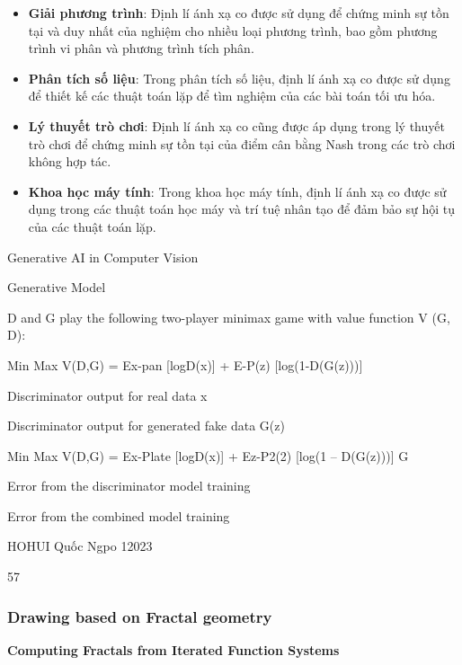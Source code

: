 \begin{itemize}
    \item \textbf{Giải phương trình}: Định lí ánh xạ co được sử dụng để chứng minh sự tồn tại và duy nhất của nghiệm cho nhiều loại phương trình, bao gồm phương trình vi phân và phương trình tích phân.
    \item \textbf{Phân tích số liệu}: Trong phân tích số liệu, định lí ánh xạ co được sử dụng để thiết kế các thuật toán lặp để tìm nghiệm của các bài toán tối ưu hóa.
    \item \textbf{Lý thuyết trò chơi}: Định lí ánh xạ co cũng được áp dụng trong lý thuyết trò chơi để chứng minh sự tồn tại của điểm cân bằng Nash trong các trò chơi không hợp tác.
    \item \textbf{Khoa học máy tính}: Trong khoa học máy tính, định lí ánh xạ co được sử dụng trong các thuật toán học máy và trí tuệ nhân tạo để đảm bảo sự hội tụ của các thuật toán lặp.
\end{itemize}













Generative AI in Computer Vision

Generative Model

D and G play the following two-player minimax game with value function V (G, D):

Min Max V(D,G) = Ex-pan [logD(x)] + E-P(z) [log(1-D(G(z)))]

Discriminator output for real data x

Discriminator output for generated fake data G(z)

Min Max V(D,G) = Ex-Plate [logD(x)] + Ez-P2(2) [log(1 – D(G(z)))] G

Error from the discriminator model training

Error from the combined model training

HOHUI Quốc Ngpo 12023

57





\pagebreak
\subsubsection {Drawing based on Fractal geometry}
\textbf{Computing Fractals from Iterated Function Systems}

